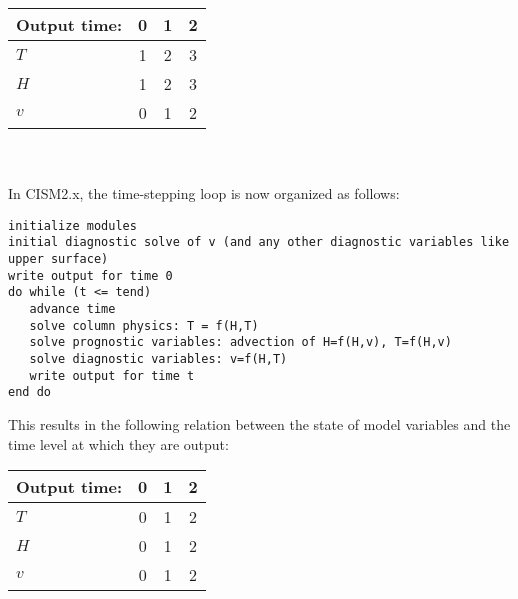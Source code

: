 \begin{tabular}{lccc}
\hline
Output time:  & 0    & 1   & 2  \\
\hline
$T$  &  1                    &  2                    &  3  \\
$H$  &  1                    &  2                    &  3  \\
$v$  &  0                    &  1                    &  2  \\
\hline
\end{tabular}
\\~\\  %

In CISM2.x, the time-stepping loop is now organized as follows:
\begin{verbatim}
initialize modules
initial diagnostic solve of v (and any other diagnostic variables like upper surface)
write output for time 0
do while (t <= tend)
   advance time
   solve column physics: T = f(H,T) 
   solve prognostic variables: advection of H=f(H,v), T=f(H,v)
   solve diagnostic variables: v=f(H,T)
   write output for time t
end do
\end{verbatim}

\noindent
This results in the following relation between the state of model variables and
the time level at which they are output:

\begin{tabular}{lccc}
\hline
Output time:  & 0    & 1   & 2  \\
\hline
$T$  &  0                    &  1                    &  2  \\
$H$  &  0                    &  1                    &  2  \\
$v$  &  0                    &  1                    &  2  \\
\hline
\end{tabular}



